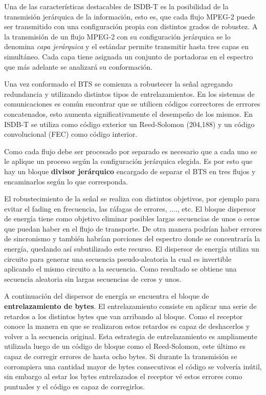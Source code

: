 \documentclass[journal,comsoc]{IEEEtran}
\begin{document}
Una de las características destacables de ISDB-T es la posibilidad de la transmisión jerárquica de la información, esto es, que cada flujo MPEG-2 puede ser transmitido con una configuración propia con distintos grados de robustez. A la transmisión de un flujo MPEG-2 con su configuración jerárquica se lo denomina \textit{capa jerárquica} y el estándar permite transmitir hasta tres capas en simultáneo. Cada capa tiene asignada un conjunto de portadoras en el espectro que más adelante se analizará su conformación.

Una vez conformado el BTS se comienza a robustecer la señal agregando redundancia y utilizando distintos tipos de entrelazamientos. En los sistemas de comunicaciones es común encontrar que se utilicen códigos correctores de errrores concatenados, esto aumenta significativamente el desempeño de los mismos. En ISDB-T se utiliza como código exterior un Reed-Solomon (204,188) y un código convolucional (FEC) como código interior.  

Como cada flujo debe ser procesado por separado es necesario que a cada uno se le aplique un proceso según la configuración jerárquica elegida. Es por esto que hay un bloque \textbf{divisor jerárquico} encargado de separar el BTS en tres flujos y encaminarlos según lo que corresponda.

El robustecimiento de la señal se realiza con distintos objetivos, por ejemplo para evitar el fading en frecuencia, las ráfagas de errores, ...., etc. El bloque dispersor de energía tiene como objetivo eliminar posibles largas secuencias de unos o ceros que puedan haber en el flujo de transporte. De otra manera podrían haber errores de sincronismo y también habrían porciones del espectro donde se concentraría la energía, quedando así subutilizado este recurso. El dispersor de energía utiliza un circuito para generar una secuencia pseudo-aleatoria la cual es invertible aplicando el mismo circuito a la secuencia. Como resultado se obtiene una secuencia aleatoria sin largas secuencias de ceros y unos.

A continuación del dispersor de energía se encuentra el bloque de \textbf{entrelazamiento de bytes}. El entrelazamiento consiste en aplicar una serie de retardos a los distintos bytes que van arribando al bloque. Como el receptor conoce la manera en que se realizaron estos retardos es capaz de deshacerlos y volver a la secuencia original. Esta estrategia de entrelazamiento es ampliamente utilizada luego de un código de bloque como el Reed-Solomon, este último es capaz de corregir errores de hasta ocho bytes. Si durante la transmisión se corrompiera una cantidad mayor de bytes consecutivos el código se volvería inútil, sin embargo al estar los bytes entrelazados el receptor vé estos errores como puntuales y el código es capaz de corregirlos.
\end{document}
